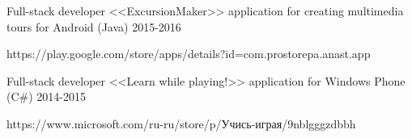 \begin{cventries}
\cventry
{Full-stack developer} %
{<<ExcursionMaker>> application for creating multimedia tours for Android  (Java) } %
{} %
{2015-2016} %
{ %
 \begin{cvitems}
\item {https://play.google.com/store/apps/details?id=com.prostorepa.anast.app}
 \end{cvitems}
}


\cventry
{Full-stack developer} %
{<<Learn while playing!>> application for Windows Phone  (C\#) } %
{} %
{2014-2015} %
{ %
 \begin{cvitems}
\item {https://www.microsoft.com/ru-ru/store/p/Учись-играя/9nblgggzdbbh}
 \end{cvitems}
}

\end{cventries}